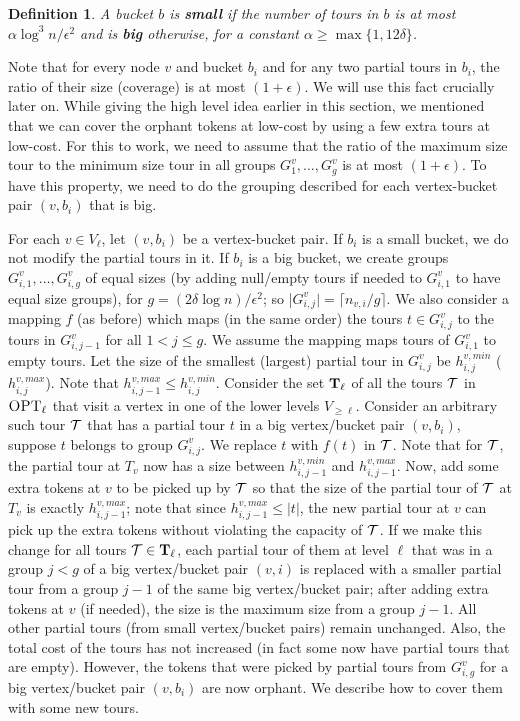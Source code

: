 \documentclass[twoside,leqno]{article}
\newtheorem{definition}{Definition}
\newcommand{\calT}{{\cal T}}
\newcommand{\OPT}{\mbox{\sc OPT}}
\newcommand{\eps}{\epsilon}
\begin{document}
\begin{definition}
A bucket $b$ is \textbf{small} if the number of tours in $b$ is at most $\alpha \log^3 n / \eps^2$ and is \textbf{big} otherwise,
for a constant $\alpha \ge \max\{1, 12\delta\}$.
\end{definition}


Note that for every node $v$ and bucket $b_i$ and for any two partial tours in $b_i$, the ratio of their size (coverage)
is at most $(1 + \eps)$. We will use this fact crucially later on.
While giving the high level idea earlier in this section, we mentioned that we can cover the orphant
tokens at low-cost by using a few extra tours at low-cost. For this to work, we need to assume that the ratio of the maximum size tour to the minimum size tour
in all groups $G^v_1,\ldots,G^v_g$ is at most $(1 + \eps)$. To have this property,
we need to do the grouping described for each vertex-bucket pair $(v,b_i)$ that is big.

For each $v \in V_\ell$, let $(v,b_i)$ be a vertex-bucket pair. If $b_i$ is a small bucket, we do not modify the partial tours in it.
If $b_i$ is a big bucket, we create groups $G^v_{i,1}, \ldots, G^v_{i,g}$ of equal sizes
(by adding null/empty tours if needed to $G^v_{i,1}$ to have equal size groups), for $g = (2\delta \log n)/\eps^2 $; so
|$G^v_{i,j}|=\lceil n_{v,i}/g\rceil$. We also consider a mapping $f$ (as before) which maps (in the same order) the
tours $t\in G^v_{i,j}$ to the tours in $G^v_{i,j-1}$ for all $1<j\leq g$.  We assume the mapping maps tours of $G^v_{i,1}$ to
empty tours.
Let the size of the smallest (largest) partial tour in $G^v_{i,j}$ be $h^{v,min}_{i,j}$ ($h^{v,max}_{i,j}$). Note that
$h^{v,max}_{i,j-1}\leq h^{v,min}_{i,j}$.
Consider the set ${\bf T}_\ell$ of all the tours $\calT$ in $\OPT_\ell$ that visit a vertex in one of the lower levels $V_{\geq \ell}$. Consider an arbitrary such tour $\calT$ that has a partial tour $t$ in a big vertex/bucket pair $(v,b_i)$,
suppose $t$ belongs to group $G^v_{i,j}$. We replace $t$ with $f(t)$ in $\calT$.
Note that for $\calT$, the partial tour at $T_v$ now has a size between
$h^{v,min}_{i,j-1}$ and $h^{v,max}_{i,j-1}$. Now, add some extra tokens at $v$ to be picked up by $\calT$ so that
the size of the partial tour of $\calT$ at $T_v$ is exactly $h^{v,max}_{i,j-1}$; note that
 since $h^{v,max}_{i,j-1}\leq |t|$, the new partial tour at $v$ can pick up the extra tokens without violating the capacity
of $\calT$.
If we make this change for all tours $\calT\in {\bf T}_\ell$, each partial tour of them at level $\ell$ that was in a group
$j<g$ of a big vertex/bucket pair $(v,i)$ is replaced with a smaller partial tour from a group $j-1$ of the same big vertex/bucket
pair; after adding extra tokens at $v$ (if needed), the size is the maximum size from a group $j-1$.
All other partial tours (from small vertex/bucket pairs) remain unchanged. Also, the total cost of the tours has not increased (in fact some now have partial tours that are empty). However, the tokens that were picked by
partial tours from $G^v_{i,g}$ for a big vertex/bucket pair $(v,b_i)$ are now orphant. We describe how to cover them with some new tours.
\end{document}
